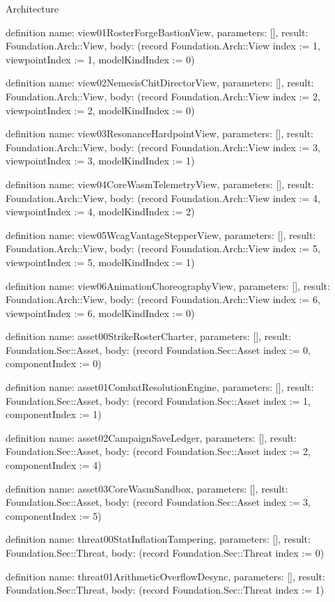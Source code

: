 \begin{lexlean}{Architecture}
\begin{semanticmodule}
definition{
  name: view01RosterForgeBastionView,
  parameters: [],
  result: Foundation.Arch::View,
  body: (record Foundation.Arch::View {index := 1, viewpointIndex := 1, modelKindIndex := 0})
}

definition{
  name: view02NemesisChitDirectorView,
  parameters: [],
  result: Foundation.Arch::View,
  body: (record Foundation.Arch::View {index := 2, viewpointIndex := 2, modelKindIndex := 0})
}

definition{
  name: view03ResonanceHardpointView,
  parameters: [],
  result: Foundation.Arch::View,
  body: (record Foundation.Arch::View {index := 3, viewpointIndex := 3, modelKindIndex := 1})
}

definition{
  name: view04CoreWasmTelemetryView,
  parameters: [],
  result: Foundation.Arch::View,
  body: (record Foundation.Arch::View {index := 4, viewpointIndex := 4, modelKindIndex := 2})
}

definition{
  name: view05WcagVantageStepperView,
  parameters: [],
  result: Foundation.Arch::View,
  body: (record Foundation.Arch::View {index := 5, viewpointIndex := 5, modelKindIndex := 1})
}

definition{
  name: view06AnimationChoreographyView,
  parameters: [],
  result: Foundation.Arch::View,
  body: (record Foundation.Arch::View {index := 6, viewpointIndex := 6, modelKindIndex := 0})
}

definition{
  name: asset00StrikeRosterCharter,
  parameters: [],
  result: Foundation.Sec::Asset,
  body: (record Foundation.Sec::Asset {index := 0, componentIndex := 0})
}

definition{
  name: asset01CombatResolutionEngine,
  parameters: [],
  result: Foundation.Sec::Asset,
  body: (record Foundation.Sec::Asset {index := 1, componentIndex := 1})
}

definition{
  name: asset02CampaignSaveLedger,
  parameters: [],
  result: Foundation.Sec::Asset,
  body: (record Foundation.Sec::Asset {index := 2, componentIndex := 4})
}

definition{
  name: asset03CoreWasmSandbox,
  parameters: [],
  result: Foundation.Sec::Asset,
  body: (record Foundation.Sec::Asset {index := 3, componentIndex := 5})
}

definition{
  name: threat00StatInflationTampering,
  parameters: [],
  result: Foundation.Sec::Threat,
  body: (record Foundation.Sec::Threat {index := 0})
}

definition{
  name: threat01ArithmeticOverflowDesync,
  parameters: [],
  result: Foundation.Sec::Threat,
  body: (record Foundation.Sec::Threat {index := 1})
}


\end{semanticmodule}
\end{lexlean}
